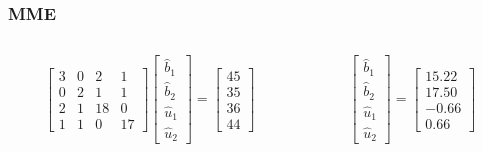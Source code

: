 \documentclass[serif,aspectratio=169]{beamer}
\begin{document}
\begin{frame}
  \frametitle{MME}
  \begin{columns}
    \begin{column}{.6\textwidth}
      $$
      \left[\begin{array}{rrrr}
          3 & 0 & 2 & 1\\
          0 & 2 & 1 & 1\\
          2 & 1 & 18 & 0\\
          1 & 1 & 0 & 17
        \end{array}\right]
      \left[\begin{array}{c}
          \hat{b}_1\\
          \hat{b}_2\\
          \hat{u}_1\\
          \hat{u}_2
        \end{array}\right]=
      \left[\begin{array}{c}
          45\\
          35\\
          36\\
          44
        \end{array}\right]
      $$

    \end{column}
    \pause
    \begin{column}{.4\textwidth}
      
      $$
      \left[\begin{array}{c}
          \hat{b}_1\\
          \hat{b}_2\\
          \hat{u}_1\\
          \hat{u}_2
        \end{array}\right]=
      \left[\begin{array}{r}
          15.22\\
          17.50\\
          -0.66\\
          0.66
        \end{array}\right]
      $$
      
    \end{column}
  \end{columns}
\end{frame}
\end{document}
